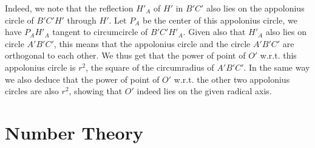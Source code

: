 \documentclass[11pt,a4paper]{article}
\begin{document}
\begin{enumerate}
    	Indeed, we note that the reflection $H'_A$ of $H'$ in $B'C'$ also lies on the appolonius circle of 
    	$B'C'H'$ through $H'$. 
    	Let $P_A$ be the center of this appolonius circle, 
    	we have $P_AH'_A$ tangent to circumcircle of $B'C'H'_A$. 
    	Given also that $H'_A$ also lies on circle $A'B'C'$, 
    	this means that the appolonius circle and the circle $A'B'C'$ are orthogonal to each other. 
    	We thus get that the power of point of $O'$ w.r.t. this appolonius circle is $r^2$, the square of the circumradius of $A'B'C'$. 
    	In the same way we also deduce that the power of point of $O'$ w.r.t. the other two appolonius circles are also $r^2$, 
    	showing that $O'$ indeed lies on the given radical axis. 
    \end{enumerate}
    
    \section*{Number Theory}
\end{document}
